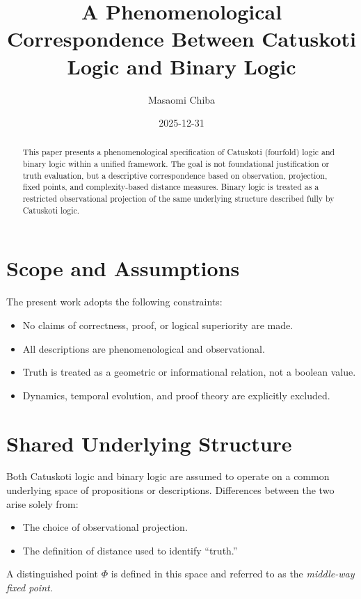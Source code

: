 \documentclass[11pt]{article}
\title{A Phenomenological Correspondence Between Catuskoti Logic and Binary Logic}
\author{Masaomi Chiba}
\date{2025-12-31}
\begin{document}
\maketitle

\begin{abstract}
This paper presents a phenomenological specification of Catuskoti (fourfold) logic
and binary logic within a unified framework.
The goal is not foundational justification or truth evaluation,
but a descriptive correspondence based on observation, projection, fixed points,
and complexity-based distance measures.
Binary logic is treated as a restricted observational projection
of the same underlying structure described fully by Catuskoti logic.
\end{abstract}

\section{Scope and Assumptions}

The present work adopts the following constraints:

\begin{itemize}
\item No claims of correctness, proof, or logical superiority are made.
\item All descriptions are phenomenological and observational.
\item Truth is treated as a geometric or informational relation, not a boolean value.
\item Dynamics, temporal evolution, and proof theory are explicitly excluded.
\end{itemize}

\section{Shared Underlying Structure}

Both Catuskoti logic and binary logic are assumed to operate on a common underlying
space of propositions or descriptions.
Differences between the two arise solely from:

\begin{itemize}
\item The choice of observational projection.
\item The definition of distance used to identify ``truth.''
\end{itemize}

A distinguished point $\Phi$ is defined in this space and referred to as the
\emph{middle-way fixed point}.
\end{document}
